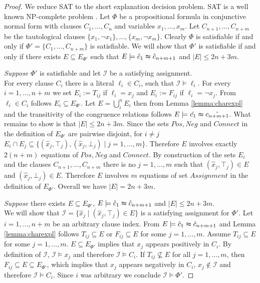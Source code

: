 \begin{proof}

We reduce SAT to the short explanation decision problem.
SAT is a well known NP-complete problem \cite{Biere2009}.
Let $\Phi$ be a propositional formula in conjunctive normal form with clauses $C_1,\ldots,C_n$ and variables $x_1,\ldots,x_m$.
Let $C_{n+1},\ldots,C_{n+m}$ be the tautological clauses $\{x_1, \neg x_1\},\ldots,\{x_m,\neg x_m\}$.
Clearly $\Phi$ is satisfiable if and only if $\Phi' = \{C_1,\ldots,C_{n+m}\}$ is satisfiable.
We will show that $\Phi'$ is satisfiable if and only if there exists $E \subseteq E_{\Phi'}$ such that $E \models \hat{c}_1 \thickapprox \hat{c}_{n+m+1}$ and $|E| \leq 2n + 3m$.

\emph{Suppose} $\Phi'$ is satisfiable and let $\mathcal{I}$ be a satisfying assignment.\\
For every clause $C_i$ there is a literal $\ell_i \in C_i$, such that $\mathcal{I} \models \ell_i$.
For every $i = 1,\ldots,n+m$ we set $E_i:= T_{ij}$ if $\ell_i = x_j$ and $E_i:= F_{ij}$ if $\ell_i = \neg x_j$.
From $\ell_i \in C_i$ follows $E_i \subseteq E_{\Phi'}$.
Let $E = \bigcup_i^n E_i$ then from Lemma \ref{lemma:charexpl} and the transitivity of the congruence relations follows $E \models \hat{c_1} \thickapprox \hat{c_{n+m+1}}$.
What remains to show is that $|E| \leq 2n + 3m$.
Since the sets $Pos, Neg$ and $Connect$ in the definition of $E_{\Phi'}$ are pairwise disjoint, for $i \neq j$ $E_i \cap E_j \subseteq \{(\hat{x}_j,\top_j),(\hat{x}_j,\bot_j) \mid j = 1,\ldots,m\}$.
Therefore $E$ involves exactly $2(n+m)$ equations of $Pos, Neg$ and $Connect$.
By construction of the sets $E_i$ and the clauses $C_{n+1},\ldots,C_{n+m}$ there is no $j = 1,\ldots,m$ such that $(\hat{x}_j,\top_j) \in E$ and $(\hat{x}_j,\bot_j) \in E$.
Therefore $E$ involves $m$ equations of set $Assignment$ in the definition of $E_{\Phi'}$.
Overall we have $|E| = 2n + 3m$.

\emph{Suppose} there exists $E \subseteq E_{\Phi'}$, $E \models \hat{c}_1 \thickapprox \hat{c}_{n+m+1}$ and $|E| \leq 2n + 3m$.\\
We will show that $\mathcal{I} = \{\hat{x}_j \mid (\hat{x}_j,\top_j) \in E\}$ is a satisfying assignment for $\Phi'$.
Let $i = 1,\ldots,n+m$ be an arbitrary clause index.
From $E \models \hat{c}_1 \thickapprox \hat{c}_{n+m+1}$ and Lemma \ref{lemma:charexpl} follows $T_{ij} \subseteq E$ or $F_{ij} \subseteq E$ for some $j=1,\ldots,m$.
Assume $T_{ij} \subseteq E$ for some $j = 1,\ldots,m$.
$E \subseteq E_{\Phi'}$ implies that $x_j$ appears positively in $C_i$. 
By definition of $\mathcal{I}$, $\mathcal{I} \models x_j$ and therefore $\mathcal{I} \models C_i$.
If $T_{ij} \nsubseteq E$ for all $j = 1,\ldots,m$, then $F_{ij} \subseteq E \subseteq E_{\Phi'}$, which implies that $x_j$ appears negatively in $C_i$, $x_j \notin \mathcal{I}$ and therefore $\mathcal{I} \models C_i$. Since $i$ was arbitrary we conclude $\mathcal{I} \models \Phi'$.

\end{proof}


